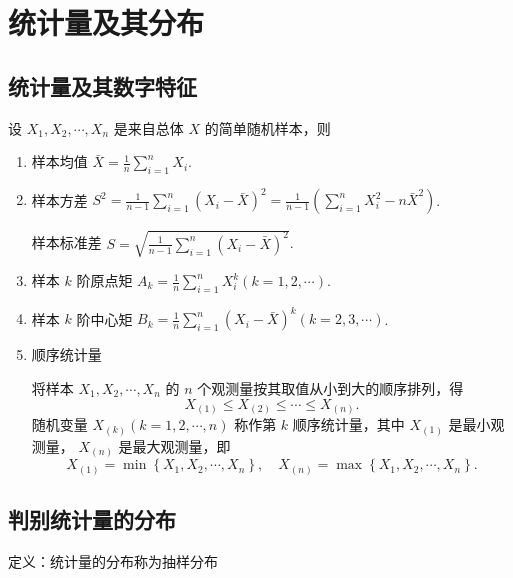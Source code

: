 \chapter{统计量及其分布}
\section{统计量及其数字特征}
设 $X_{1}, X_{2}, \cdots, X_{n}$ 是来自总体 $X$ 的简单随机样本，则
\begin{enumerate}
    \item 样本均值 $\bar{X}=\frac{1}{n} \sum_{i=1}^{n} X_{i}$.
    \item 样本方差 $S^{2}=\frac{1}{n-1} \sum_{i=1}^{n}\left(X_{i}-\bar{X}\right)^{2}=\frac{1}{n-1}\left(\sum_{i=1}^{n} X_{i}^{2}-n \bar{X}^{2}\right)$.

          样本标准差 $S=\sqrt{\frac{1}{n-1} \sum_{i=1}^{n}\left(X_{i}-\bar{X}\right)^{2}}$.
    \item 样本 $k$ 阶原点矩 $A_{k}=\frac{1}{n} \sum_{i=1}^{n} X_{i}^{k}(k=1,2, \cdots)$.
    \item 样本 $k$ 阶中心矩 $B_{k}=\frac{1}{n} \sum_{i=1}^{n}\left(X_{i}-\bar{X}\right)^{k}(k=2,3, \cdots)$.
    \item 顺序统计量

          将样本 $X_{1}, X_{2}, \cdots, X_{n}$ 的 $n$ 个观测量按其取值从小到大的顺序排列，得
          $$X_{(1)} \leqslant X_{(2)} \leqslant \cdots \leqslant X_{(n)}.$$
          随机变量 $X_{(k)}(k=1,2, \cdots, n)$ 称作第 $k$ 顺序统计量，其中 $X_{(1)}$ 是最小观测量， $X_{(n)}$ 是最大观测量，即
          $$X_{(1)}=\min \left\{X_{1}, X_{2}, \cdots, X_{n}\right\}, \quad X_{(n)}=\max \left\{X_{1}, X_{2}, \cdots, X_{n}\right\}.$$
\end{enumerate}

\section{判别统计量的分布}
定义：统计量的分布称为抽样分布


